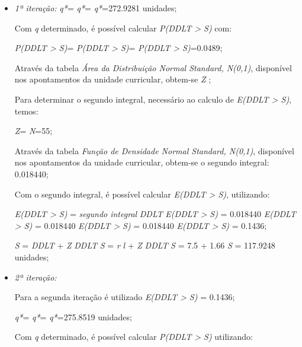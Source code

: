 \begin{itemize}
	\item \emph{1ª iteração:}
	\emph{q*}=
	\emph{q*}=
	\emph{q*}=272.9281  unidades;

	Com \emph{q} determinado, é possível calcular \emph{P(DDLT > S)} com:

	\emph{P(DDLT > S)}=
	\emph{P(DDLT > S)}=
	\emph{P(DDLT > S)}=0.0489;

	Através da tabela \emph{Área da Distribuição Normal Standard, N(0,1)}, disponível nos apontamentos da unidade curricular, obtem-se \emph{Z} ;
	
	Para determinar o segundo integral, necessário ao calculo de \emph{E(DDLT > S)}, temos:
	
	\emph{Z}=
	\emph{N}=55;

	Através da tabela \emph{Função de Densidade Normal Standard, N(0,1)}, disponível nos apontamentos da unidade curricular, obtem-se o segundo integral: 0.018440;

	Com o segundo integral, é possível calcular \emph{E(DDLT > S)}, utilizando:

	\emph{E(DDLT > S)} = \emph{segundo integral} \times \emph{\sigma}\emph{DDLT}
	\emph{E(DDLT > S)} = 0.018440 \times {}
	\emph{E(DDLT > S)} = 0.018440 \times {}
	\emph{E(DDLT > S)} = 0.018440 
	\emph{E(DDLT > S)} = 0.1436;

	\emph{S} = \emph{\mu}\emph{DDLT} + \emph{Z} \times \emph{\sigma}\emph{DDLT}
	\emph{S} = \emph{r} \times \emph{l} + \emph{Z} \times \emph{\sigma}\emph{DDLT}
	\emph{S} = 7.5  + 1.66 
	\emph{S} = 117.9248  unidades;

	
\item \emph{2ª iteração:}
	
	Para a segunda iteração é utilizado \emph{E(DDLT > S)} = 0.1436;
	
	\emph{q*}=
	\emph{q*}=
	\emph{q*}=275.8519  unidades;

	Com \emph{q} determinado, é possível calcular \emph{P(DDLT > S)} utilizando:


\end{itemize}
